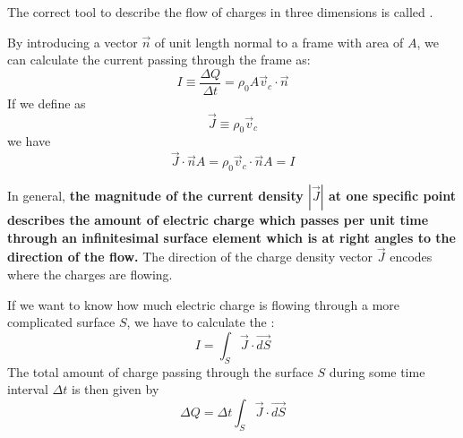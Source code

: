 The correct tool to describe the flow of charges in three dimensions is called \textbf{}. 
\begin{qt}
    By introducing a vector $\vec{n}$ of unit length normal to a frame with area of $A$, we can calculate the current passing through the frame as:
    \begin{equation}
I \equiv \frac{\Delta Q}{\Delta t}=\rho_{0} A \vec{v}_{c} \cdot \vec{n}
\end{equation}
If we define \textbf{} as 
\begin{equation}
\vec{J} \equiv \rho_{0} \vec{v}_{c}
\end{equation}
we have
\begin{equation}
\vec{J} \cdot \vec{n} A=\rho_{0} \vec{v}_{c} \cdot \vec{n} A=I
\end{equation}
\end{qt}
In general, \textbf{the magnitude of the current density $|\vec{J}|$ at one specific point describes the amount of electric charge which passes per unit time through an infinitesimal surface element which is at right angles to the direction of the flow.} The direction of the charge density vector $\vec{J}$ encodes where the charges are flowing.

\begin{qt}
    If we want to know how much electric charge is flowing through a more complicated surface $S$, we have to calculate the \textbf{}:
    \begin{equation}
I=\int_{S} \vec{J} \cdot \overrightarrow{d S}
\end{equation}
The total amount of charge passing through the surface $S$ during some time interval $\Delta t$ is then given by
\begin{equation}
\Delta Q=\Delta t \int_{S} \vec{J} \cdot \overrightarrow{d S}
\end{equation}
\end{qt}

